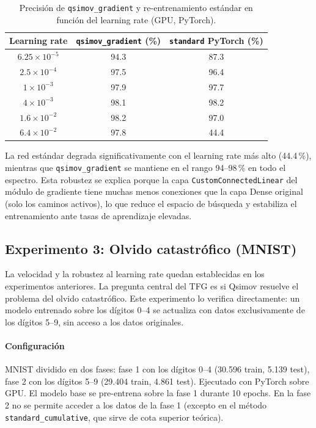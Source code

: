 \begin{table}[htbp]
  \centering
  \caption{Precisión de \texttt{qsimov\_gradient} y re-entrenamiento estándar en función del
           learning rate (GPU, PyTorch).}
  \label{tab:tabla3}
  \begin{tabular}{ccc}
    \toprule
    \textbf{Learning rate} & \textbf{\texttt{qsimov\_gradient} (\%)} & \textbf{\texttt{standard} PyTorch (\%)} \\
    \midrule
    $6.25 \times 10^{-5}$ & 94.3 & 87.3 \\
    $2.5  \times 10^{-4}$ & 97.5 & 96.4 \\
    $1    \times 10^{-3}$ & 97.9 & 97.7 \\
    $4    \times 10^{-3}$ & 98.1 & 98.2 \\
    $1.6  \times 10^{-2}$ & 98.2 & 97.0 \\
    $6.4  \times 10^{-2}$ & 97.8 & 44.4 \\
    \bottomrule
  \end{tabular}
\end{table}

La red estándar degrada significativamente con el learning rate más alto (44.4\,\%), mientras que
\texttt{qsimov\_gradient} se mantiene en el rango 94--98\,\% en todo el espectro. Esta robustez se
explica porque la capa \texttt{CustomConnectedLinear} del módulo de gradiente tiene muchas menos
conexiones que la capa Dense original (solo los caminos activos), lo que reduce el espacio de
búsqueda y estabiliza el entrenamiento ante tasas de aprendizaje elevadas.

\subsection{Experimento 3: Olvido catastrófico (MNIST)}

La velocidad y la robustez al learning rate quedan establecidas en los experimentos anteriores. La
pregunta central del TFG es si Qsimov resuelve el problema del olvido catastrófico. Este
experimento lo verifica directamente: un modelo entrenado sobre los dígitos 0--4 se actualiza con
datos exclusivamente de los dígitos 5--9, sin acceso a los datos originales.

\paragraph{Configuración} MNIST dividido en dos fases: fase 1 con los dígitos 0--4 (30.596 train,
5.139 test), fase 2 con los dígitos 5--9 (29.404 train, 4.861 test). Ejecutado con PyTorch sobre
GPU. El modelo base se pre-entrena sobre la fase 1 durante 10 epochs. En la fase 2 no se permite
acceder a los datos de la fase 1 (excepto en el método \texttt{standard\_cumulative}, que sirve de
cota superior teórica).

